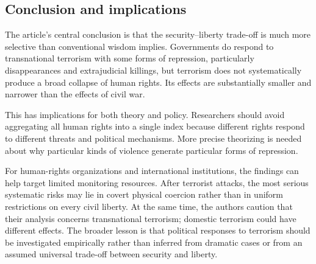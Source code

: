 \subsection{Conclusion and implications}

The article's central conclusion is that the security--liberty trade-off is much more selective than conventional wisdom implies. Governments do respond to transnational terrorism with some forms of repression, particularly disappearances and extrajudicial killings, but terrorism does not systematically produce a broad collapse of human rights. Its effects are substantially smaller and narrower than the effects of civil war.

This has implications for both theory and policy. Researchers should avoid aggregating all human rights into a single index because different rights respond to different threats and political mechanisms. More precise theorizing is needed about why particular kinds of violence generate particular forms of repression.

For human-rights organizations and international institutions, the findings can help target limited monitoring resources. After terrorist attacks, the most serious systematic risks may lie in covert physical coercion rather than in uniform restrictions on every civil liberty. At the same time, the authors caution that their analysis concerns transnational terrorism; domestic terrorism could have different effects. The broader lesson is that political responses to terrorism should be investigated empirically rather than inferred from dramatic cases or from an assumed universal trade-off between security and liberty.
